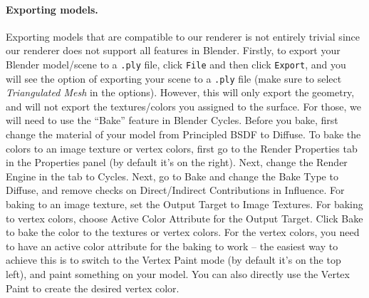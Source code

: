 \paragraph{Exporting models.} Exporting models that are compatible to our renderer is not entirely trivial since our renderer does not support all features in Blender. Firstly, to export your Blender model/scene to a \lstinline{.ply} file, click \lstinline{File} and then click \lstinline{Export}, and you will see the option of exporting your scene to a \lstinline{.ply} file (make sure to select \emph{Triangulated Mesh} in the options). However, this will only export the geometry, and will not export the textures/colors you assigned to the surface. For those, we will need to use the ``Bake'' feature in Blender Cycles. Before you bake, first change the material of your model from Principled BSDF to Diffuse. To bake the colors to an image texture or vertex colors, first go to the Render Properties tab in the Properties panel (by default it's on the right). Next, change the Render Engine in the tab to Cycles. Next, go to Bake and change the Bake Type to Diffuse, and remove checks on Direct/Indirect Contributions in Influence. For baking to an image texture, set the Output Target to Image Textures. For baking to vertex colors, choose Active Color Attribute for the Output Target. Click Bake to bake the color to the textures or vertex colors. For the vertex colors, you need to have an active color attribute for the baking to work -- the easiest way to achieve this is to switch to the Vertex Paint mode (by default it's on the top left), and paint something on your model. You can also directly use the Vertex Paint to create the desired vertex color.



